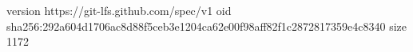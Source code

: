 version https://git-lfs.github.com/spec/v1
oid sha256:292a604d1706ac8d88f5ceb3e1204ca62e00f98aff82f1c2872817359e4c8340
size 1172
